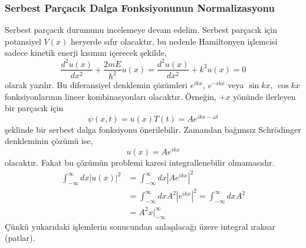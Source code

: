 \documentclass[a4paper,12pt, twoside]{article}
\begin{document}
\subsubsection{Serbest Parçacık Dalga Fonksiyonunun Normalizasyonu}

Serbest parçacık durumunu incelemeye devam edelim. Serbest parçacık için potansiyel $V(x)$ heryerde sıfır olacaktır, bu nedenle Hamiltonyen işlemcisi sadece kinetik enerji kısmını içerecek şekilde,
\begin{equation}
\frac { d ^ { 2 } u ( x ) } { d x ^ { 2 } } + \frac { 2 m E } { \hbar ^ { 2 } } u ( x ) = \frac { d ^ { 2 } u ( x ) } { d x ^ { 2 } } + k ^ { 2 } u ( x ) = 0
\label{eq:freeParticle_schEq}
\end{equation}
olarak yazılır. Bu diferansiyel denklemin çözümleri $e ^ { i k x }$, $e ^ { - i k x }$ veya $\sin kx$, $\cos kx$ fonksiyonlarının lineer kombinasyonları olacaktır. Örneğin, $+x$ yönünde ilerleyen bir parçacık için
\begin{equation}
\psi(x,t) = u(x) T(t) = A e ^ { i k x -\omega t}
\end{equation}
şeklinde bir serbest dalga fonksiyonu önerilebilir. Zamandan bağımsız Schrödinger denkleminin çözümü ise,
\begin{equation}
u(x) = A e ^ { i k x }
\end{equation}
olacaktır. Fakat bu çözümün problemi karesi integrallenebilir olmamasıdır.
\begin{align}
\int _ { - \infty } ^ { \infty } d x \left|u(x) \right| ^ { 2 } 
&= \int _ { - \infty } ^ { \infty } d x \left|A e ^ { i k x } \right|^2 \nonumber\\
&= \int _ { - \infty } ^ { \infty } d x A^2 \left|e ^ { i k x } \right|^2
= \int _ { - \infty } ^ { \infty } d x A^2 \nonumber\\
&= A^2 x\bigg|_{-\infty}^\infty
\end{align}
Çünkü yukarıdaki işlemlerin sonucundan anlaşılacağı üzere integral ıraksar (patlar). 
\end{document}
